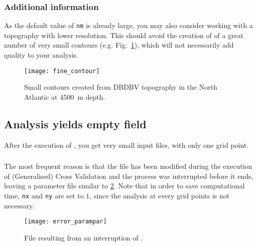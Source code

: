 \subsubsection{Additional information}

As the default value of \texttt{nm} is already large, you may also consider working with a topography with lower resolution. This should avoid the creation of of a great number of very small contours (e.g. Fig.~\ref{fig:smallcont}), which will not necessarily add quality to your analysis.


\begin{figure}[htpb]
\centering
\parbox{.65\textwidth}{
\texttt{[image: fine\_contour]}
}\parbox{.35\textwidth}{
\caption[Small contours]{Small contours created from DBDBV topography in the North Atlantic at 4500~m depth\label{fig:smallcont}.}
}
\end{figure}
 


%





\subsection{Analysis yields empty field}


After the execution of , you get very small input files, with only one grid point.

\subsubsection{\question}

The most frequent reason is that the  file has been modified during the execution of (Generalised) Cross Validation and the process was interrupted before it ends, leaving a parameter file similar to \ref{fig:errorparampar}. Note that in order to save computational time, \texttt{nx} and \texttt{ny} are set to $1$, since the analysis at every grid points is not necessary.

\begin{figure}[htpb]
\centering
\texttt{[image: error\_parampar]}
\caption{File  resulting from an interruption of .\label{fig:errorparampar}}
\end{figure}


